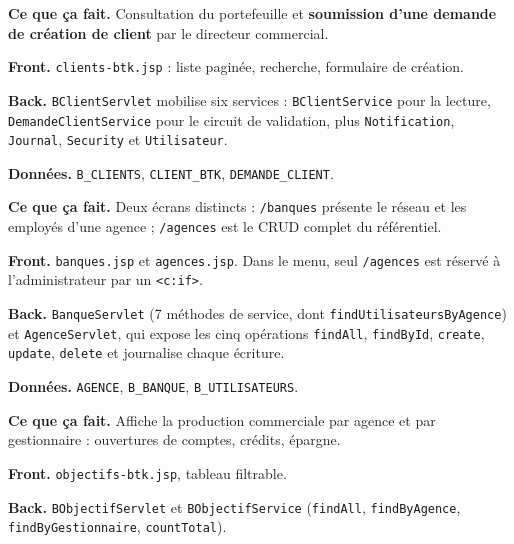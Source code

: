 
\textbf{Ce que ça fait.} Consultation du portefeuille et \textbf{soumission
d'une demande de création de client} par le directeur commercial.

\textbf{Front.} \texttt{clients-btk.jsp} : liste paginée, recherche,
formulaire de création.

\textbf{Back.} \texttt{BClientServlet} mobilise six services :
\texttt{BClientService} pour la lecture, \texttt{DemandeClientService} pour le
circuit de validation, plus \texttt{Notification}, \texttt{Journal},
\texttt{Security} et \texttt{Utilisateur}.

\textbf{Données.} \texttt{B\_CLIENTS}, \texttt{CLIENT\_BTK},
\texttt{DEMANDE\_CLIENT}.


\textbf{Ce que ça fait.} Deux écrans distincts : \texttt{/banques} présente le
réseau et les employés d'une agence ; \texttt{/agences} est le CRUD complet du
référentiel.

\textbf{Front.} \texttt{banques.jsp} et \texttt{agences.jsp}. Dans le menu,
seul \texttt{/agences} est réservé à l'administrateur par un \texttt{<c:if>}.

\textbf{Back.} \texttt{BanqueServlet} (7 méthodes de service, dont
\texttt{findUtilisateursByAgence}) et \texttt{AgenceServlet}, qui expose les
cinq opérations \texttt{findAll}, \texttt{findById}, \texttt{create},
\texttt{update}, \texttt{delete} et journalise chaque écriture.

\textbf{Données.} \texttt{AGENCE}, \texttt{B\_BANQUE}, \texttt{B\_UTILISATEURS}.


\textbf{Ce que ça fait.} Affiche la production commerciale par agence et par
gestionnaire : ouvertures de comptes, crédits, épargne.

\textbf{Front.} \texttt{objectifs-btk.jsp}, tableau filtrable.

\textbf{Back.} \texttt{BObjectifServlet} et \texttt{BObjectifService}
(\texttt{findAll}, \texttt{findByAgence}, \texttt{findByGestionnaire},
\texttt{countTotal}).

